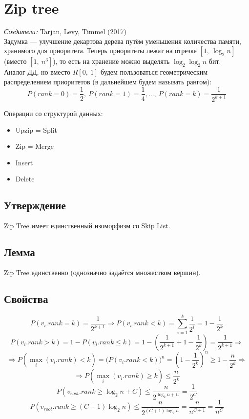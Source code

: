 \documentclass[12pt, a4paper]{article}
\begin{document}
    \section{Zip tree}
    \textit{Создатели:} Tarjan, Levy, Timmel (2017)\\
    Задумка --- улучшение декартова дерева путём уменьшения количества памяти, хранимого для приоритета. Теперь приоритеты лежат на отрезке $[1,\ \log_2 n]$ (вместо $[1,\ n^3]$), то есть на хранение можно выделять $\log_2\log_2 n$ бит.\\
    Аналог ДД, но вместо $R[0,\ 1]$ будем пользоваться геометрическим распределением приоритетов (в дальнейшем будем называть рангом):
    \[P(rank = 0) = \frac{1}{2},\ P(rank = 1) = \frac{1}{4},\dots,\ P(rank = k) = \frac{1}{2^{k + 1}}\]
    \begin{center}
        Операции со структурой данных:
    \end{center}
    \begin{itemize}
        \item Upzip = Split
        \item Zip = Merge
        \item Insert
        \item Delete
    \end{itemize}

    \subsection{Утверждение}
    Zip Tree имеет единственный изоморфизм со Skip List.
    \subsection{Лемма}
    Zip Tree единственно (однозначно задаётся множеством вершин).
    \subsection*{Свойства}
    \[P(v_i.rank = k) = \frac{1}{2^{k + 1}}\Rightarrow P(v_i.rank < k) = \sum_{i = 1}^{k} \frac{1}{2^i} = 1 - \frac{1}{2^k}\]
    \[P(v_i.rank > k) = 1 - P(v_i.rank \leq k) = 1 - \left(\frac{1}{2^{k + 1}} + 1 - \frac{1}{2^k}\right) = \frac{1}{2^{k + 1}}\Rightarrow \]
    \[\Rightarrow P(\underset{i}{\max}(v_i.rank) < k) = \big(P(v_i.rank < k)\big)^n = \left( 1 - \frac{1}{2^{k}} \right)^n \geq 1 - \frac{n}{2^k}\Rightarrow\]
    \[\Rightarrow P(\underset{i}{\max}(v_i.rank) \geq k) \leq \frac{n}{2^k}\]
    \[P(v_{root}.rank \geq \log_2 n + C) \leq \frac{n}{2^{\log_2 n + C}} = \frac{1}{2^C}\]
    \[P(v_{root}.rank \geq (C + 1)\log_2 n) \leq \frac{n}{2^{(C + 1)\log_2 n}} = \frac{n}{n^{C + 1}} = \frac{1}{n^C}\]
\end{document}
